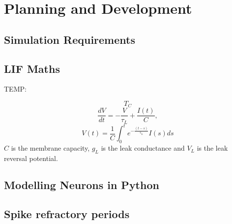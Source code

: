 \chapter{Planning and Development}

\section{Simulation Requirements}

\section{LIF Maths}

TEMP:
\begin{figure*}[h]
    \centering
    \begin{equation}\label{eq:LIF_TC}
        T_C
    \end{equation}
    \begin{equation}\label{eq:LIF_RC}
        \frac{d V}{d t} = -\frac{V}{\tau_L} + \frac{I(t)}{C},
    \end{equation}
    \begin{equation}\label{eq:integ_LIF_RC_VL}
        V(t)= \frac{1}{C} \int_{0}^{t} e^{-\frac{(t-s)}{\tau_L}} I(s) ds
    \end{equation}
    $C$ is the membrane capacity, $g_L$ is the leak conductance and $V_L$ is the leak reversal potential.
    \label{LIFequation}
\end{figure*}

\section{Modelling Neurons in Python}

\section{Spike refractory periods}